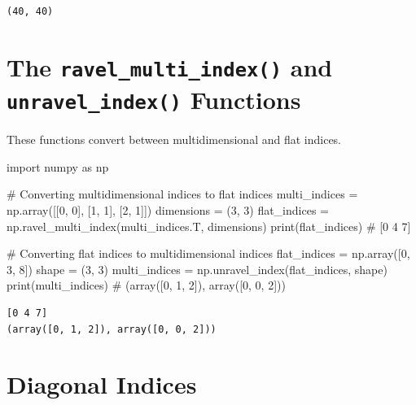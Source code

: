 \documentclass[
  english,
  letterpaper,
  DIV=11,
  numbers=noendperiod]{scrreprt}
\newenvironment{Shaded}{\begin{snugshade}}{\end{snugshade}}
\newcommand{\BuiltInTok}[1]{\textcolor[rgb]{0.00,0.23,0.31}{#1}}
\newcommand{\CommentTok}[1]{\textcolor[rgb]{0.37,0.37,0.37}{#1}}
\newcommand{\DecValTok}[1]{\textcolor[rgb]{0.68,0.00,0.00}{#1}}
\newcommand{\ImportTok}[1]{\textcolor[rgb]{0.00,0.46,0.62}{#1}}
\newcommand{\NormalTok}[1]{\textcolor[rgb]{0.00,0.23,0.31}{#1}}
\newcommand{\OperatorTok}[1]{\textcolor[rgb]{0.37,0.37,0.37}{#1}}
\begin{document}
\begin{verbatim}
(40, 40)
\end{verbatim}

\section{\texorpdfstring{The \texttt{ravel\_multi\_index()} and
\texttt{unravel\_index()}
Functions}{The ravel\_multi\_index() and unravel\_index() Functions}}\label{the-ravel_multi_index-and-unravel_index-functions}

These functions convert between multidimensional and flat indices.

\begin{Shaded}
\begin{Highlighting}[]
\ImportTok{import}\NormalTok{ numpy }\ImportTok{as}\NormalTok{ np}

\CommentTok{\# Converting multidimensional indices to flat indices}
\NormalTok{multi\_indices }\OperatorTok{=}\NormalTok{ np.array([[}\DecValTok{0}\NormalTok{, }\DecValTok{0}\NormalTok{], [}\DecValTok{1}\NormalTok{, }\DecValTok{1}\NormalTok{], [}\DecValTok{2}\NormalTok{, }\DecValTok{1}\NormalTok{]])}
\NormalTok{dimensions }\OperatorTok{=}\NormalTok{ (}\DecValTok{3}\NormalTok{, }\DecValTok{3}\NormalTok{)}
\NormalTok{flat\_indices }\OperatorTok{=}\NormalTok{ np.ravel\_multi\_index(multi\_indices.T, dimensions)}
\BuiltInTok{print}\NormalTok{(flat\_indices)  }\CommentTok{\# [0 4 7]}

\CommentTok{\# Converting flat indices to multidimensional indices}
\NormalTok{flat\_indices }\OperatorTok{=}\NormalTok{ np.array([}\DecValTok{0}\NormalTok{, }\DecValTok{3}\NormalTok{, }\DecValTok{8}\NormalTok{])}
\NormalTok{shape }\OperatorTok{=}\NormalTok{ (}\DecValTok{3}\NormalTok{, }\DecValTok{3}\NormalTok{)}
\NormalTok{multi\_indices }\OperatorTok{=}\NormalTok{ np.unravel\_index(flat\_indices, shape)}
\BuiltInTok{print}\NormalTok{(multi\_indices)  }\CommentTok{\# (array([0, 1, 2]), array([0, 0, 2]))}
\end{Highlighting}
\end{Shaded}

\begin{verbatim}
[0 4 7]
(array([0, 1, 2]), array([0, 0, 2]))
\end{verbatim}

\section{Diagonal Indices}\label{diagonal-indices}
\end{document}
